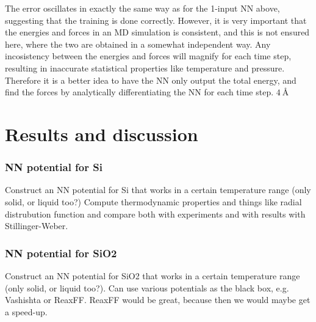 \documentclass[twoside,english]{uiofysmaster}
\begin{document}
The error oscillates in exactly the same way as for the 1-input NN above, suggesting that the training is done correctly. 
However, it is very important that the energies and forces in an MD simulation is consistent, and this is not 
ensured here, where the two are obtained in a somewhat independent way. Any incosistency between the energies and forces
will magnify for each time step, resulting in inaccurate statistical properties like temperature and pressure. 
Therefore it is a better idea to have the NN only output the total energy, and find the forces by analytically
differentiating the NN for each time step. $\SI{4}{\angstrom}$

\part{Results and discussion}

\section{NN potential for Si}
Construct an NN potential for Si that works in a certain temperature range (only solid, or liquid too?)
Compute thermodynamic properties and things like radial distrubution function and compare both 
with experiments and with results with Stillinger-Weber. 

\section{NN potential for SiO2}
Construct an NN potential for SiO2 that works in a certain temperature range (only solid, or liquid too?). 
Can use various potentials as the black box, e.g. Vashishta or ReaxFF. 
ReaxFF would be great, because then we would maybe get a speed-up. 
\end{document}
